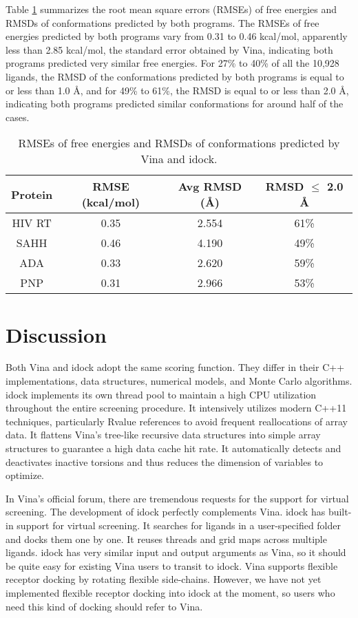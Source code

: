 \documentclass[10pt,conference,compsocconf]{../IEEEtran}
\begin{document}
Table \ref{tab:RMSEAndRMSD} summarizes the root mean square errors (RMSEs) of free energies and RMSDs of conformations predicted by both programs. The RMSEs of free energies predicted by both programs vary from 0.31 to 0.46 kcal/mol, apparently less than 2.85 kcal/mol, the standard error obtained by Vina, indicating both programs predicted very similar free energies. For 27\% to 40\% of all the 10,928 ligands, the RMSD of the conformations predicted by both programs is equal to or less than 1.0 \AA, and for 49\% to 61\%, the RMSD is equal to or less than 2.0 \AA, indicating both programs predicted similar conformations for around half of the cases.

\begin{table}
\centering
\begin{tabular*}
{\linewidth}
{@{\extracolsep{\fill}}cccc}
\toprule
Protein & RMSE (kcal/mol) & Avg RMSD (\AA) & RMSD $\leq$ 2.0 \AA\\
\midrule
HIV RT & 0.35 & 2.554 & 61\%\\
SAHH   & 0.46 & 4.190 & 49\%\\
ADA    & 0.33 & 2.620 & 59\%\\
PNP    & 0.31 & 2.966 & 53\%\\
\bottomrule
\end{tabular*}
\caption{RMSEs of free energies and RMSDs of conformations predicted by Vina and idock.}
\label{tab:RMSEAndRMSD}
\end{table}

\section{Discussion}

Both Vina and idock adopt the same scoring function. They differ in their C++ implementations, data structures, numerical models, and Monte Carlo algorithms. idock implements its own thread pool to maintain a high CPU utilization throughout the entire screening procedure. It intensively utilizes modern C++11 techniques, particularly Rvalue references to avoid frequent reallocations of array data. It flattens Vina's tree-like recursive data structures into simple array structures to guarantee a high data cache hit rate. It automatically detects and deactivates inactive torsions and thus reduces the dimension of variables to optimize.

In Vina's official forum, there are tremendous requests for the support for virtual screening. The development of idock perfectly complements Vina. idock has built-in support for virtual screening. It searches for ligands in a user-specified folder and docks them one by one. It reuses threads and grid maps across multiple ligands. idock has very similar input and output arguments as Vina, so it should be quite easy for existing Vina users to transit to idock. Vina supports flexible receptor docking by rotating flexible side-chains. However, we have not yet implemented flexible receptor docking into idock at the moment, so users who need this kind of docking should refer to Vina.
\end{document}

